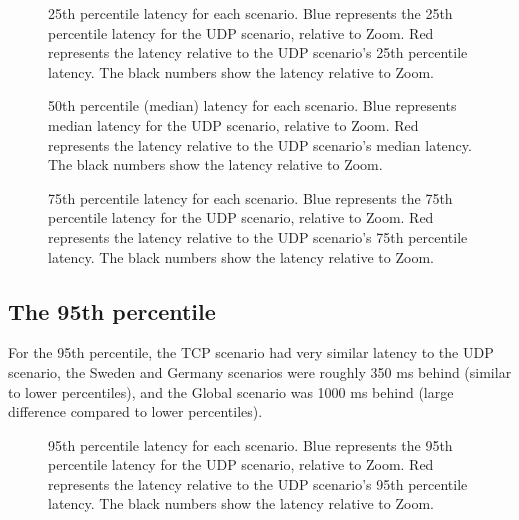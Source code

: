 \documentclass{kththesis}
\begin{document}
\begin{figure}[!htb]
    \centering
    
    \caption{25th percentile latency for each scenario. Blue represents the 25th percentile latency for the UDP scenario, relative to Zoom. Red represents the latency relative to the UDP scenario's 25th percentile latency. The black numbers show the latency relative to Zoom.}
    \label{fig:25thPercentile}
\end{figure}

\begin{figure}[!htb]
    \centering
    
    \caption{50th percentile (median) latency for each scenario. Blue represents median latency for the UDP scenario, relative to Zoom. Red represents the latency relative to the UDP scenario's median latency. The black numbers show the latency relative to Zoom.}
    \label{fig:50thPercentile}
\end{figure}

\begin{figure}[!htb]
    \centering
    
    \caption{75th percentile latency for each scenario. Blue represents the 75th percentile latency for the UDP scenario, relative to Zoom. Red represents the latency relative to the UDP scenario's 75th percentile latency. The black numbers show the latency relative to Zoom.}
    \label{fig:75thPercentile}
\end{figure}

\subsection{The 95th percentile}
For the 95th percentile, the TCP scenario had very similar latency to the UDP scenario, the Sweden and Germany scenarios were roughly 350 ms behind (similar to lower percentiles), and the Global scenario was 1000 ms behind (large difference compared to lower percentiles).

\begin{figure}[!htb]
    \centering
    
    \caption{95th percentile latency for each scenario. Blue represents the 95th percentile latency for the UDP scenario, relative to Zoom. Red represents the latency relative to the UDP scenario's 95th percentile latency. The black numbers show the latency relative to Zoom.}
    \label{fig:95thPercentile}
\end{figure}
\end{document}
